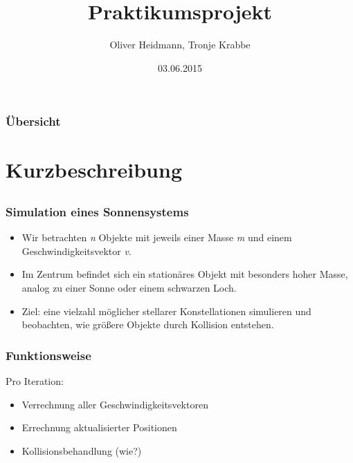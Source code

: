 \documentclass{beamer}
\title[PAPO 2015]{Praktikumsprojekt}
\author{Oliver Heidmann, Tronje Krabbe}
\institute[UHH]
{
Uni Hamburg \\
Praktikum Parallele Programmierung\\
}
\date{03.06.2015}
\begin{document}
\begin{frame}
\titlepage
\end{frame}

\begin{frame}
\frametitle{Übersicht}
\tableofcontents
\end{frame}



\section{Kurzbeschreibung}

\subsection{}


\begin{frame}
    \frametitle{Simulation eines Sonnensystems}
    \begin{itemize}
        \item Wir betrachten \textit{n} Objekte
            mit jeweils einer Masse \textit{m}
            und einem Geschwindigkeitsvektor \textit{v}.
        \item Im Zentrum befindet sich ein stationäres Objekt
            mit besonders hoher Masse, analog zu einer Sonne
            oder einem schwarzen Loch.
        \item Ziel: eine vielzahl möglicher stellarer
            Konstellationen simulieren und beobachten,
            wie größere Objekte durch Kollision entstehen.
    \end{itemize}
\end{frame}


\begin{frame}
    \frametitle{Funktionsweise}
    Pro Iteration:
    \begin{itemize}
        \item Verrechnung aller Geschwindigkeitsvektoren
        \item Errechnung aktualisierter Positionen
        \item Kollisionsbehandlung (wie?)
    \end{itemize}
\end{frame}
\end{document}
